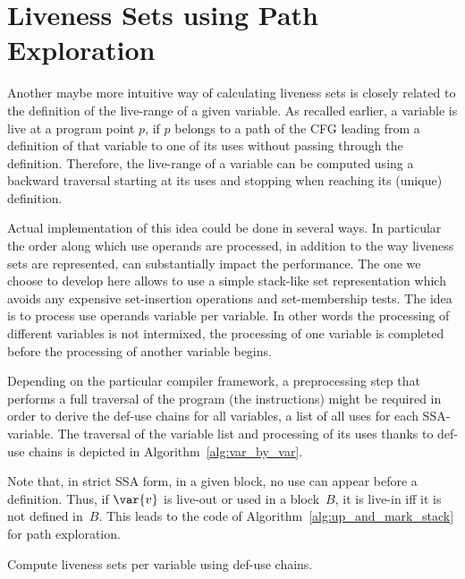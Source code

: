 \section{Liveness Sets using Path Exploration}
\label{sec:path-explore}

Another maybe more intuitive way of calculating liveness sets is closely related to the definition of the live-range of a given variable.
As recalled earlier, a variable is live at a program point $p$, if $p$ belongs to a path of the CFG leading from a definition of that variable to one of its uses without passing through the definition.
Therefore, the live-range of a variable can be computed using a backward traversal starting at its uses and stopping when reaching its (unique) definition.

Actual implementation of this idea could be done in several ways.
In particular the order along which use operands are processed, in addition to the way liveness sets are represented, can substantially impact the performance.
The one we choose to develop here allows to use a simple stack-like set representation which avoids any expensive set-insertion operations and set-membership tests.
The idea is to process use operands variable per variable.
In other words the processing of different variables is not intermixed, \ie the processing of one variable is completed before the processing of another variable begins.

Depending on the particular compiler framework, a preprocessing step that performs a full traversal of the program (\ie the instructions) might be required in order to derive the def-use chains for all variables, \ie a list of all uses for each SSA-variable.
The traversal of the variable list and processing of its uses thanks to def-use chains is depicted in Algorithm~\ref{alg:var_by_var}.

Note that, in strict SSA form, in a given block, no use can appear before a definition.
Thus, if $\var{v}$ is live-out or used in a block~$B$, it is live-in iff it is not defined in~$B$.
This leads to the code of Algorithm~\ref{alg:up_and_mark_stack} for path exploration.


\begin{algorithm}[h]
  \caption{Compute liveness sets per variable using def-use chains.}
  \label{alg:var_by_var}
\end{algorithm}




